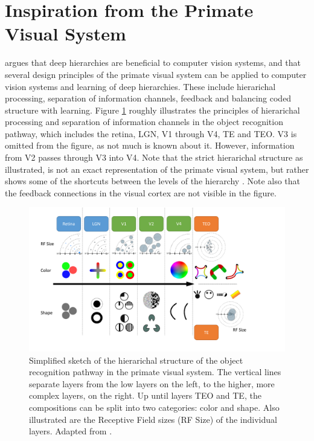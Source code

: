 \section{Inspiration from the Primate Visual System}
\label{sec:pvc}
\citet{kruger2013deep} argues that deep hierarchies are beneficial to computer vision systems,
and that several design principles of the primate visual system can be applied
to computer vision systems and learning of deep hierarchies.
These include hierarichal processing, separation of information channels,
feedback and balancing coded structure with learning.
Figure \ref{fig:pvc1} roughly illustrates the principles of hierarichal processing and separation of information channels
in the object recognition pathway, which includes the retina, LGN, V1 through V4, TE and TEO.
V3 is omitted from the figure, as not much is known about it.
However, information from V2 passes through V3 into V4.
Note that the strict hierarichal structure as illustrated, is not an exact representation of the primate visual system,
but rather shows some of the shortcuts between the levels of the hierarchy \citep{kruger2013deep}.
Note also that the feedback connections in the visual cortex are not visible in the figure.

\begin{figure}[h!]
\centering
\includegraphics[width=1.1\textwidth]{graphics/pvc_figure1}
\caption[Object Recognition Pathway]{
Simplified sketch of the hierarichal structure of the object recognition pathway in the primate visual system.
The vertical lines separate layers from the low layers on the left, to the higher, more complex layers, on the right.
Up until layers TEO and TE, the compositions can be split into two categories: color and shape.
Also illustrated are the Receptive Field sizes (RF Size) of the individual layers.
Adapted from \cite{kruger2013deep}.
}
\label{fig:pvc1}
\end{figure}


